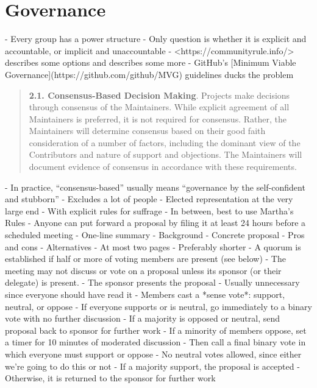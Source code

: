 \documentclass[10pt,letterpaper]{article}
\begin{document}
\section{Governance}

- Every group has a power structure
  - Only question is whether it is explicit and accountable, or implicit and unaccountable \cite{Freeman1972}
- <https://communityrule.info/> describes some options and \cite{Fogel2021} describes some more
- GitHub's [Minimum Viable Governance](https://github.com/github/MVG) guidelines ducks the problem

\begin{quotation}
  \textbf{2.1. Consensus-Based Decision Making}.
  Projects make decisions through consensus of the Maintainers.
  While explicit agreement of all Maintainers is preferred, it is not required for consensus.
  Rather, the Maintainers will determine consensus based on their good faith consideration of a number of factors,
  including the dominant view of the Contributors and nature of support and objections.
  The Maintainers will document evidence of consensus in accordance with these requirements.
\end{quotation}

- In practice, ``consensus-based'' usually means ``governance by the self-confident and stubborn''
  - Excludes a lot of people
- Elected representation at the very large end
  - With explicit rules for suffrage
- In between, best to use Martha's Rules \cite{Minahan1986}
- Anyone can put forward a proposal by filing it at least 24 hours before a scheduled meeting
  - One-line summary
  - Background
  - Concrete proposal
  - Pros and cons
  - Alternatives
- At most two pages
  - Preferably shorter
- A quorum is established if half or more of voting members are present (see below)
- The meeting may not discuss or vote on a proposal unless its sponsor (or their delegate) is present.
- The sponsor presents the proposal
  - Usually unnecessary since everyone should have read it
- Members cast a *sense vote*: support, neutral, or oppose
  - If everyone supports or is neutral, go immediately to a binary vote with no further discussion
  - If a majority is opposed or neutral, send proposal back to sponsor for further work
- If a minority of members oppose, set a timer for 10 minutes of moderated discussion
- Then call a final binary vote in which everyone must support or oppose
  - No neutral votes allowed, since either we're going to do this or not
- If a majority support, the proposal is accepted
  - Otherwise, it is returned to the sponsor for further work
\end{document}
